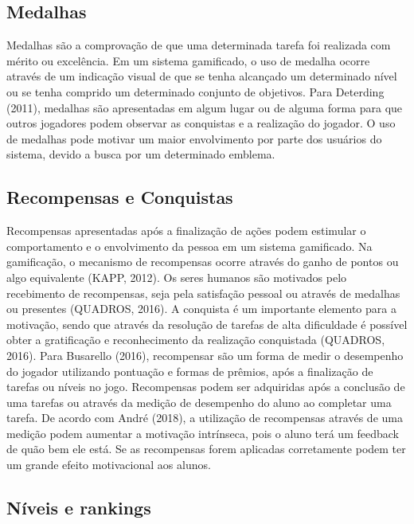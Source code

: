 \documentclass[
	12pt,				%
	oneside,			%
	a4paper,			%
	english,			%
	french,				%
	spanish,			%
	brazil,				%
	]{abntex2}
\begin{document}
\subsection{Medalhas}

	Medalhas são a comprovação de que uma determinada tarefa foi realizada com mérito ou excelência. Em um sistema gamificado, o uso de medalha ocorre através de um indicação visual de que se tenha alcançado um determinado nível ou se tenha comprido um determinado conjunto de objetivos. Para Deterding (2011), medalhas são apresentadas em algum lugar ou de alguma forma para que outros jogadores podem observar as conquistas e a realização do jogador. O uso de medalhas pode motivar um maior envolvimento por parte dos usuários do sistema, devido a busca por um determinado emblema.
    
\subsection{Recompensas e Conquistas}    

	Recompensas apresentadas após a finalização de ações podem estimular o comportamento e o envolvimento da pessoa em um sistema gamificado. Na gamificação, o mecanismo de recompensas ocorre através do ganho de pontos ou algo equivalente (KAPP, 2012). Os seres humanos são motivados pelo recebimento de recompensas, seja pela satisfação pessoal ou através de medalhas ou presentes (QUADROS, 2016).
A conquista é um importante elemento para a motivação, sendo que através da resolução de tarefas de alta dificuldade é possível obter a gratificação e reconhecimento da realização conquistada (QUADROS, 2016). Para Busarello (2016), recompensar são um forma de medir o desempenho do jogador utilizando pontuação e formas de prêmios, após a finalização de tarefas ou níveis no jogo.
	Recompensas podem ser adquiridas após a conclusão de uma tarefas ou através da medição de desempenho do aluno ao completar uma tarefa. De acordo com André (2018), a utilização de recompensas através de uma medição podem aumentar a motivação intrínseca, pois o aluno terá um feedback de quão bem ele está. Se as recompensas forem aplicadas corretamente podem ter um grande efeito motivacional aos alunos.
    
\subsection{Níveis e rankings}        
\end{document}
